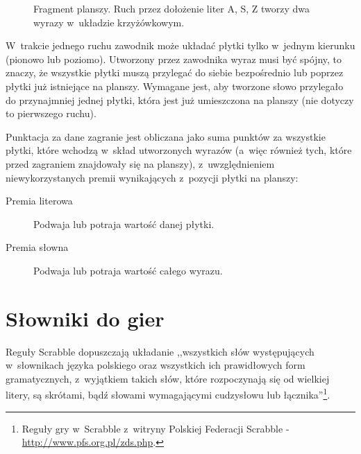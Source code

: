 \documentclass[a4paper,twocolumn,12pt]{article}
\begin{document}
\begin{figure}[ht!]
\begin{center}
		\caption{Fragment planszy. Ruch przez dołożenie liter A, S, Z tworzy dwa wyrazy w~układzie krzyżówkowym.}
		\label{fig:crossword_second}
	\end{center}
\end{figure}

W~trakcie jednego ruchu zawodnik może układać płytki tylko w~jednym kierunku (pionowo lub poziomo). Utworzony przez zawodnika wyraz musi być spójny, to znaczy, że wszystkie płytki muszą przylegać do siebie bezpośrednio lub poprzez płytki już istniejące na planszy. Wymagane jest, aby tworzone słowo przylegało do przynajmniej jednej płytki, która jest już umieszczona na planszy (nie dotyczy to pierwszego ruchu).

Punktacja za dane zagranie jest obliczana jako suma punktów za wszystkie płytki, które wchodzą w~skład utworzonych wyrazów (a~więc również tych, które przed zagraniem znajdowały się na planszy), z~uwzględnieniem niewykorzystanych premii wynikających z~pozycji płytki na planszy:

\begin{description}
 \item [Premia literowa] Podwaja lub potraja wartość danej płytki.
 \item [Premia słowna] Podwaja lub potraja wartość całego wyrazu.
\end{description}

\section*{Słowniki do gier}

Reguły Scrabble dopuszczają układanie ,,wszystkich słów występujących w~słownikach języka polskiego oraz wszystkich ich prawidłowych form gramatycznych, z~wyjątkiem takich słów, które rozpoczynają się od wielkiej litery, są skrótami, bądź słowami wymagającymi cudzysłowu lub łącznika''\footnote{Reguły gry w~Scrabble z~witryny Polskiej Federacji Scrabble - \url{http://www.pfs.org.pl/zds.php}.}. 
\end{document}
